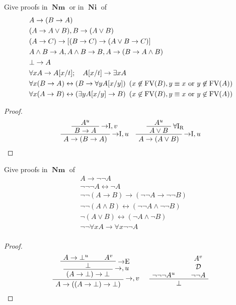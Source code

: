 \documentclass[11pt]{article}
\def \EBA {\EnableBpAbbreviations}
\def \RL[#1]{\RightLabel{#1}}
\DeclareMathOperator{\Nm}{\textbf{Nm}}
\DeclareMathOperator{\Ni}{\textbf{Ni}}
\begin{document}
\begin{exercise}
Give proofs in \(\Nm\) or in \(\Ni\) of
\begin{align*}
&A\to(B\to A)\\
&(A\to A\vee B),B\to(A\vee B)\\
&(A\to C)\to[(B\to C)\to(A\vee B\to C)]\\
&A\wedge B\to A,A\wedge B\to B,A\to(B\to A\wedge B)\\
&\bot\to A\\
&\forall xA\to A[x/t];\quad A[x/t]\to\exists xA\\
&\forall x(B\to A)\leftrightarrow(B\to\forall yA[x/y])\enspace
(x\not\in\text{FV}(B),y\equiv x\text{ or }y\not\in\text{FV}(A))\\
&\forall x(A\to B)\leftrightarrow(\exists yA[x/y]\to B)\enspace
(x\not\in\text{FV}(B),y\equiv x\text{ or }y\not\in\text{FV}(A))
\end{align*}
\end{exercise}
\begin{proof}
\begin{gather*}
\EBA\AXC{$A^u$}
\RL{${\to}\text{I},v$}\UIC{$B\to A$}
\RL{${\to}\text{I},u$}\UIC{$A\to(B\to A)$}\DP\quad
\EBA\AXC{$A^u$}\RL{$\forall\text{I}_\text{R}$}
\UIC{$A\vee B$}\RL{${\to}\text{I},u$}
\UIC{$A\to (A\vee B)$}\DP
\end{gather*}
\end{proof}

\begin{exercise}
Give proofs in \(\Nm\) of 
\begin{align*}
&A\to\neg\neg A\\
&\neg\neg\neg A\leftrightarrow\neg A\\
&\neg\neg(A\to B)\to(\neg\neg A\to\neg\neg B)\\
&\neg\neg(A\wedge B)\leftrightarrow(\neg\neg A\wedge\neg\neg B)\\
&\neg(A\vee B)\leftrightarrow(\neg A\wedge \neg B)\\
&\neg\neg\forall xA\to\forall x\neg\neg A\\
\end{align*}
\end{exercise}
\begin{proof}
\begin{gather*}
\EBA\AXC{$A\to\bot^u$}
\AXC{$A^v$}\RL{$\to$E}
\BIC{$\bot$}\RL{$\to,u$}
\UIC{$(A\to\bot)\to\bot$}\RL{$\to,v$}
\UIC{$A\to((A\to\bot)\to\bot)$}\DP\hspace{0.5cm}
\EBA\AXC{$\neg\neg\neg A^u$}
\AXC{$A^v$}
\noLine\UIC{$\cald$}\noLine\UIC{$\neg\neg A$}
\BIC{$\bot$}\DP
\end{gather*}
\end{proof}
\end{document}
